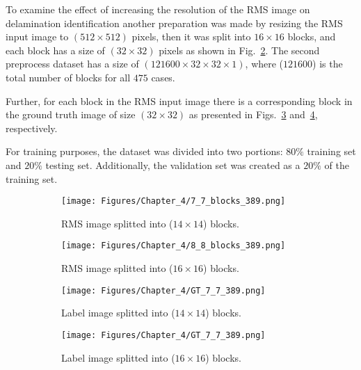 To examine the effect of increasing the resolution of the RMS image on delamination identification another  preparation was made by resizing the RMS input image to \((512\times 512)\) pixels, then it was split into \(16\times 16\) blocks, and each block has a size of \((32\times 32)\) pixels as shown in Fig.~\ref{fig:RMS_64blocks}.
The second preprocess dataset has a size of \((121600 \times 32 \times 32 \times 1)\), where (\(121600\)) is the total number of blocks for all \(475\) cases.

Further, for each block in the RMS input image there is a corresponding block in the ground truth image of size \((32\times 32)\) as presented in Figs.~\ref{fig:GT_49blocks} and~\ref{fig:GT_64blocks}, respectively.

For training purposes, the dataset was divided into two portions: \(80\%\)	training set and \(20\%\) testing set. 
Additionally, the validation set was created as a \(20\%\) of the training set.
\begin{figure} [h!]
	\centering
	\begin{subfigure}[b]{0.47\textwidth}
		\centering
		\texttt{[image: Figures/Chapter\_4/7\_7\_blocks\_389.png]}
		\caption{RMS image splitted into (\(14\times 14\)) blocks.}
		\label{fig:RMS_49blocks}
	\end{subfigure}
	\hfill
	\begin{subfigure}[b]{0.47\textwidth}
		\centering
		\texttt{[image: Figures/Chapter\_4/8\_8\_blocks\_389.png]}
		\caption{RMS image splitted into (\(16\times 16\)) blocks.}
		\label{fig:RMS_64blocks}
	\end{subfigure}
	\hfill
	\begin{subfigure}[b]{0.47\textwidth}
	\centering
	\texttt{[image: Figures/Chapter\_4/GT\_7\_7\_389.png]}
	\caption{Label image splitted into (\(14\times 14\)) blocks.}
	\label{fig:GT_49blocks}
	\end{subfigure}
	\hfill
	\begin{subfigure}[b]{0.47\textwidth}
		\centering
		\texttt{[image: Figures/Chapter\_4/GT\_7\_7\_389.png]}
		\caption{Label image splitted into (\(16\times 16\)) blocks.}
		\label{fig:GT_64blocks}
	\end{subfigure}
	\caption{}
	\label{fig:grid_mesh}
\end{figure}

